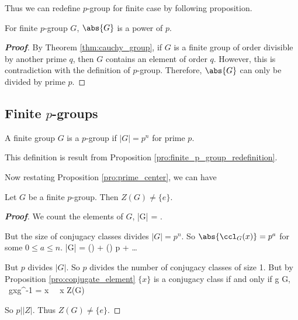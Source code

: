 Thus we can redefine $p$-group for finite case by following proposition.

\begin{proposition}\label{pro:finite_p_group_redefinition}
For finite $p$-group $G$, $\abs{G}$ is a power of $p$.
\end{proposition}

\begin{proof}[\bf Proof]
By Theorem \ref{thm:cauchy_group}, if $G$ is a finite group of order divisible by another prime $q$, then $G$ contains an element of order $q$. However, this is contradiction with the definition of $p$-group. Therefore, $\abs{G}$ can only be divided by prime $p$.
\end{proof}

\subsection{Finite $p$-groups}

\begin{definition}
A finite group $G$ is a $p$-group if $|G| = p^n$ for prime $p$.
\end{definition}

\begin{remark}
This definition is result from Proposition \ref{pro:finite_p_group_redefinition}.
\end{remark}

Now restating Proposition \ref{pro:prime_center}, we can have

\begin{theorem}\label{thm:finite_p_group_centre}
Let $G$ be a finite $p$-group. Then $Z(G) \neq \{e\}$.
\end{theorem}

\begin{proof}[\bf Proof]
We count the elements of $G$,
\be
|G| = \sum {}.
\ee

But the size of conjugacy classes divides $|G| = p^n$. So $\abs{\ccl_G(x)} = p^a$ for some $0 \leq a \leq n$.
\beast
|G| = ()   + () \cdot p  + \dots
\eeast

But $p$ divides $|G|$. So $p$ divides the number of conjugacy classes of size 1. But by Proposition \ref{pro:conjugate_element} $\{x\}$ is a conjugacy class if and only if
\be
\forall g \in G, \ gxg^{-1} = x \ \lra \ x \in Z(G)
\ee

So $p | |Z|$. Thus $Z(G) \neq \{e\}$.
\end{proof}


